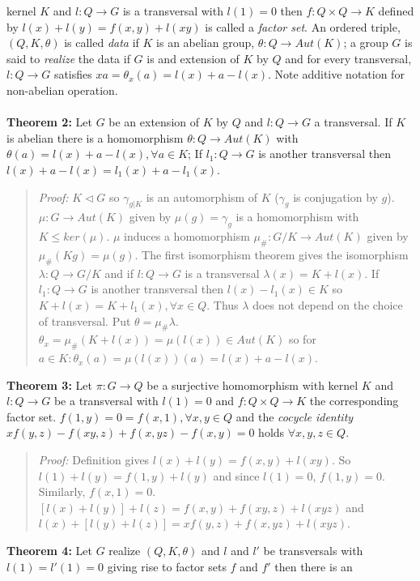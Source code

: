 kernel $K$ and $l:Q \rightarrow G$ is a transversal with $l(1)=0$ then
$f: Q \times Q \rightarrow K$ defined by $l(x)+l(y)= f(x,y) + l(xy)$ is
called a \emph{factor set}.  An ordered triple, $(Q, K, \theta)$ is called \emph{data}
if $K$ is an abelian group, $\theta: Q \rightarrow Aut(K)$; a group $G$ is said to
\emph{realize} the data if $G$ is and extension of $K$ by $Q$ and for every transversal,
$l: Q \rightarrow G$ satisfies $xa = \theta_x(a)
= l(x) +a-l(x)$.  Note additive notation for non-abelian operation.
\\
\\
{\bf Theorem 2:}
Let $G$ be an extension of $K$ by $Q$ and
$l: Q \rightarrow G$ a transversal.  If $K$ is abelian there is a homomorphism
$\theta: Q \rightarrow Aut(K)$ with $\theta(a)= l(x)+a-l(x), \forall a \in K$;
If $l_1: Q \rightarrow G$ is another transversal then
$ l(x)+a-l(x)= l_1(x)+a-l_1(x)$.
\begin{quote}
\emph{Proof:}
$K \lhd G$ so $\gamma_{g|K}$ is an automorphism of $K$ ($\gamma_g$ is conjugation by $g$).
$\mu: G \rightarrow Aut(K)$ given by $\mu(g)= \gamma_g$ is a homomorphism with
$K \leq ker(\mu)$.  $\mu$ induces a homomorphism $\mu_{\#}: G/K \rightarrow Aut(K)$ given by
$\mu_{\#}(Kg)= \mu(g)$.
The first isomorphism theorem gives the isomorphism $\lambda: Q \rightarrow G/K$ and if
$l:Q \rightarrow G$ is a transversal $\lambda(x)=K+l(x)$.
If $l_1: Q \rightarrow G$ is another transversal then $l(x) - l_1(x) \in K$ so
$ K+l(x)= K+l_1(x), \forall x \in Q $.  Thus $\lambda$ does not depend on the choice of transversal.
Put $\theta= \mu_{\#} \lambda$.  $\theta_x = \mu_{\#}(K+l(x))= \mu(l(x)) \in Aut(K)$ so for $a \in K:
\theta_x(a)= \mu(l(x))(a)= l(x)+a-l(x)$.
\end{quote}
{\bf Theorem 3:}
Let $\pi: G \rightarrow Q$ be a surjective homomorphism with kernel $K$ and
$l:Q \rightarrow G$ be a transversal with $l(1)=0$ and $f: Q \times Q \rightarrow K$ the corresponding
factor set.  $f(1,y)=0=f(x,1), \forall x,y \in Q$ and
the \emph{cocycle identity} $xf(y,z)-f(xy,z)+f(x,yz)-f(x,y)=0$ holds $\forall x,y,z \in Q$.
\begin{quote}
\emph{Proof:}  
Definition gives $l(x)+l(y)= f(x,y)+l(xy)$.
So $l(1)+l(y)= f(1,y)+l(y)$ and since $l(1)=0$, $f(1,y)= 0$.  Similarly, $f(x,1)=0$.
$[l(x)+l(y)]+l(z)= f(x,y)+f(xy,z)+l(xyz)$ and
$l(x)+[l(y)+l(z)]= xf(y,z)+f(x,yz)+l(xyz)$.
\end{quote}
{\bf Theorem 4:}
Let $G$ realize $(Q, K, \theta )$ and $l$ and $l'$ be transversals with
$l(1)=l'(1)=0$ giving rise to factor sets $f$ and $f'$ then there is an
